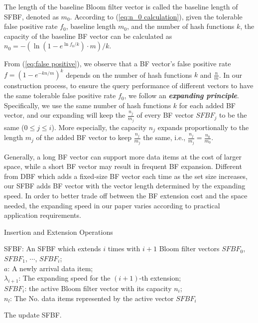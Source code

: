\documentclass[10pt,journal,letterpaper]{IEEEtran}
\begin{document}
The length of the baseline Bloom filter vector is called the baseline length of SFBF, denoted as $m_0$. According to (\ref{eq:n_0 calculation}), given the tolerable false positive rate $f_0$, baseline length $m_0$, and the number of hash functions $k$, the capacity of the baseline BF vector can be calculated as ${n_0} =  - \left( {\ln \left( {1 - {e^{\ln {f_0}/k}}} \right) \cdot m} \right)/k$.

From (\ref{eq:false positive}), we observe that a BF vector's false positive rate $f = {\left( {1 - {e^{ - kn/m}}} \right)^k}$ depends on the number of hash functions $k$ and $\frac{n}{m}$. In our construction process, to ensure the query performance of different vectors to have the same tolerable false positive rate $f_0$, we follow an \emph{\textbf{expanding principle}}. Specifically, we use the same number of hash functions $k$ for each added BF vector, and our expanding will keep the $\frac{{{n_j}}}{{{m_j}}}$ of every BF vector $SFBF_j$ to be the same ($0 \le j \le i$). More especially, the capacity $n_j$ expands proportionally to the length $m_j$ of the added BF vector to keep $\frac{n_j}{m_j}$ the same, i.e., $\frac{{{n_j}}}{{{m_j}}} = \frac{{{n_0}}}{{{m_0}}}$.





Generally, a long BF vector can support more data items at the cost of larger space, while a short BF vector may result in frequent BF expansion. Different from DBF \cite{guo2006theory, wei2010mad2} which adds a fixed-size BF vector each time as the set size increases,  our SFBF adds BF vector with the vector length  determined by the expanding speed. In order to better trade off between the BF extension cost and the space needed, the expanding speed in our paper varies according to practical application requirements.



\begin{algorithm}[h]
\caption{Insertion and Extension Operations}
\label{alg:Insertion Operations}
\begin{algorithmic}[1]
\REQUIRE
SFBF: An SFBF which extends $i$ times with $i+1$ Bloom filter vectors $SFBF_0$, $SFBF_1$, $\cdots$, $SFBF_i$;\\
$a$: A newly arrival data item; \\
$\lambda_{i+1}$: The expanding speed for the  $(i+1)$-th extension;\\
$SFBF_i$: the active Bloom filter vector with its capacity $n_i$;\\
$n_l$: The No. data items represented by the active vector $SFBF_i$


\ENSURE
The update SFBF.\\

\ENDIF
{}
\ENDFOR
{}
\end{algorithmic}
\end{algorithm}
\end{document}
